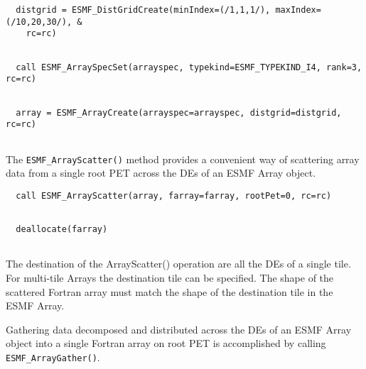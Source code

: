 
 \begin{verbatim}
  distgrid = ESMF_DistGridCreate(minIndex=(/1,1,1/), maxIndex=(/10,20,30/), &
    rc=rc)
 
\end{verbatim}
 

 \begin{verbatim}
  call ESMF_ArraySpecSet(arrayspec, typekind=ESMF_TYPEKIND_I4, rank=3, rc=rc)
 
\end{verbatim}
 

 \begin{verbatim}
  array = ESMF_ArrayCreate(arrayspec=arrayspec, distgrid=distgrid, rc=rc)
 
\end{verbatim}
 

   The {\tt ESMF\_ArrayScatter()} method provides a convenient way of scattering
   array data from a single root PET across the DEs of an ESMF Array object. 

 \begin{verbatim}
  call ESMF_ArrayScatter(array, farray=farray, rootPet=0, rc=rc)
 
\end{verbatim}
 

 \begin{verbatim}
  deallocate(farray)
 
\end{verbatim}
 

   The destination of the ArrayScatter() operation are all the DEs of a single
   tile. For multi-tile Arrays the destination tile can be specified. The 
   shape of the scattered Fortran array must match the shape of the destination
   tile in the ESMF Array.
  
   Gathering data decomposed and distributed across the DEs of an ESMF Array
   object into a single Fortran array on root PET is accomplished by calling
   {\tt ESMF\_ArrayGather()}. 

